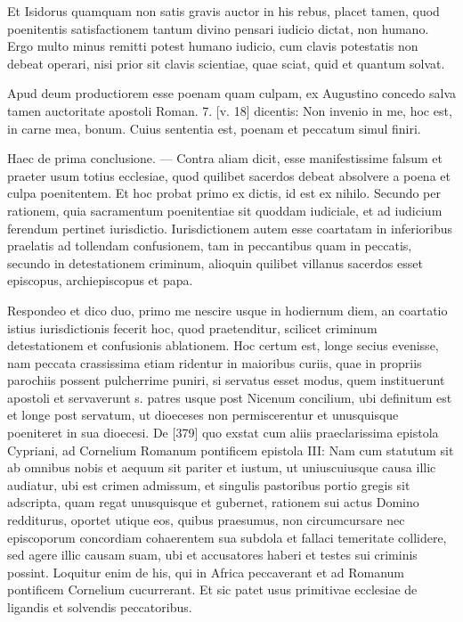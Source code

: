 Et Isidorus quamquam non satis gravis auctor in his rebus, placet tamen, quod poenitentis satisfactionem tantum divino pensari iudicio dictat, non humano. Ergo multo minus remitti potest humano iudicio, cum clavis potestatis non debeat operari, nisi prior sit clavis scientiae, quae sciat, quid et quantum solvat.

Apud deum productiorem esse poenam quam culpam, ex Augustino concedo salva tamen auctoritate apostoli Roman. 7. [v. 18] dicentis: Non invenio in me, hoc est, in carne mea, bonum. Cuius sententia est, poenam et peccatum simul finiri.

Haec de prima conclusione. — Contra aliam dicit, esse manifestissime falsum et praeter usum totius ecclesiae, quod quilibet sacerdos debeat absolvere a poena et culpa poenitentem. Et hoc probat primo ex dictis, id est ex nihilo. Secundo per rationem, quia sacramentum poenitentiae sit quoddam iudiciale, et ad iudicium ferendum pertinet iurisdictio. Iurisdictionem autem esse coartatam in inferioribus praelatis ad tollendam confusionem, tam in peccantibus quam in peccatis, secundo in detestationem criminum, alioquin quilibet villanus sacerdos esset episcopus, archiepiscopus et papa.

Respondeo et dico duo, primo me nescire usque in hodiernum diem, an coartatio istius iurisdictionis fecerit hoc, quod praetenditur, scilicet criminum detestationem et confusionis ablationem. Hoc certum est, longe secius evenisse, nam peccata crassissima etiam ridentur in maioribus curiis, quae in propriis parochiis possent pulcherrime puniri, si servatus esset modus, quem instituerunt apostoli et servaverunt s. patres usque post Nicenum concilium, ubi definitum est et longe post servatum, ut dioeceses non permiscerentur et unusquisque poeniteret in sua dioecesi. De [379] quo exstat cum aliis praeclarissima epistola Cypriani, ad Cornelium Romanum pontificem epistola III: Nam cum statutum sit ab omnibus nobis et aequum sit pariter et iustum, ut uniuscuiusque causa illic audiatur, ubi est crimen admissum, et singulis pastoribus portio gregis sit adscripta, quam regat unusquisque et gubernet, rationem sui actus Domino redditurus, oportet utique eos, quibus praesumus, non circumcursare nec episcoporum concordiam cohaerentem sua subdola et fallaci temeritate collidere, sed agere illic causam suam, ubi et accusatores haberi et testes sui criminis possint. Loquitur enim de his, qui in Africa peccaverant et ad Romanum pontificem Cornelium cucurrerant. Et sic patet usus primitivae ecclesiae de ligandis et solvendis peccatoribus.


